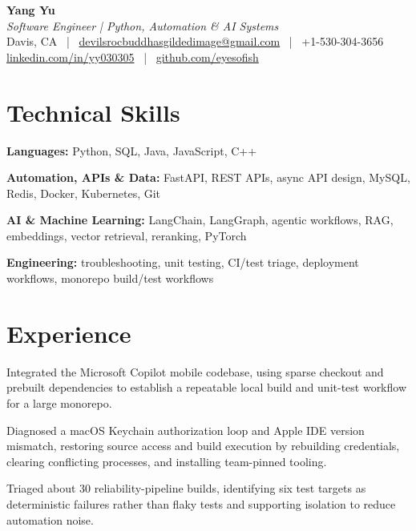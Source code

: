 \documentclass[letterpaper,10pt]{article}
\begin{document}
\begin{center}
  \textbf{\Large Yang Yu} \\
  \textit{Software Engineer | Python, Automation \& AI Systems} \\[1pt]
  \small Davis, CA ~|~ \href{mailto:devilsrocbuddhasgildedimage@gmail.com}{devilsrocbuddhasgildedimage@gmail.com} ~|~ +1-530-304-3656 \\
  \small \href{https://linkedin.com/in/yy030305}{linkedin.com/in/yy030305} ~|~ \href{https://github.com/eyesofish}{github.com/eyesofish}
\end{center}

\section{Technical Skills}
\resumeItemListStart
  \item \textbf{Languages:} Python, SQL, Java, JavaScript, C++
  \item \textbf{Automation, APIs \& Data:} FastAPI, REST APIs, async API design, MySQL, Redis, Docker, Kubernetes, Git
  \item \textbf{AI \& Machine Learning:} LangChain, LangGraph, agentic workflows, RAG, embeddings, vector retrieval, reranking, PyTorch
  \item \textbf{Engineering:} troubleshooting, unit testing, CI/test triage, deployment workflows, monorepo build/test workflows
\resumeItemListEnd

\section{Experience}
\resumeSubHeadingListStart
{}
\resumeItemListStart
  \item Integrated the Microsoft Copilot mobile codebase, using sparse checkout and prebuilt dependencies to establish a repeatable local build and unit-test workflow for a large monorepo.
  \item Diagnosed a macOS Keychain authorization loop and Apple IDE version mismatch, restoring source access and build execution by rebuilding credentials, clearing conflicting processes, and installing team-pinned tooling.
  \item Triaged about 30 reliability-pipeline builds, identifying six test targets as deterministic failures rather than flaky tests and supporting isolation to reduce automation noise.
\resumeItemListEnd
\resumeSubHeadingListEnd
\end{document}
